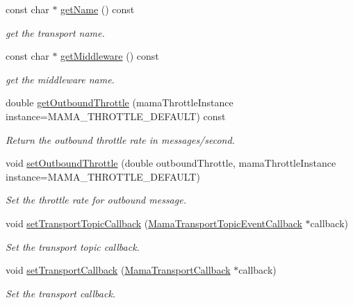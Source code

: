 \begin{DoxyCompactItemize}
const char $\ast$ \hyperlink{classWombat_1_1MamaTransport_a21a15a3509ad2a2f6b56f4dc21c8335d}{getName} () const 
\begin{DoxyCompactList}\small\item\em get the transport name. \item\end{DoxyCompactList}\item 
const char $\ast$ \hyperlink{classWombat_1_1MamaTransport_ab819fc0d4b50f26d38cabd7abf988584}{getMiddleware} () const 
\begin{DoxyCompactList}\small\item\em get the middleware name. \item\end{DoxyCompactList}\item 
double \hyperlink{classWombat_1_1MamaTransport_a9b655776b7f3c20f83e1dca446194551}{getOutboundThrottle} (mamaThrottleInstance instance=MAMA\_\-THROTTLE\_\-DEFAULT) const 
\begin{DoxyCompactList}\small\item\em Return the outbound throttle rate in messages/second. \item\end{DoxyCompactList}\item 
void \hyperlink{classWombat_1_1MamaTransport_a49a60259218d8326cfd95041ded1a0e2}{setOutboundThrottle} (double outboundThrottle, mamaThrottleInstance instance=MAMA\_\-THROTTLE\_\-DEFAULT)
\begin{DoxyCompactList}\small\item\em Set the throttle rate for outbound message. \item\end{DoxyCompactList}\item 
void \hyperlink{classWombat_1_1MamaTransport_ac3750ad8df8203d256467021c26efd35}{setTransportTopicCallback} (\hyperlink{classWombat_1_1MamaTransportTopicEventCallback}{MamaTransportTopicEventCallback} $\ast$callback)
\begin{DoxyCompactList}\small\item\em Set the transport topic callback. \item\end{DoxyCompactList}\item 
void \hyperlink{classWombat_1_1MamaTransport_a39e8c1cff1ee0693b457f0dbdb76b52a}{setTransportCallback} (\hyperlink{classWombat_1_1MamaTransportCallback}{MamaTransportCallback} $\ast$callback)
\begin{DoxyCompactList}\small\item\em Set the transport callback. \item\end{DoxyCompactList}\item 

\end{DoxyCompactItemize}

